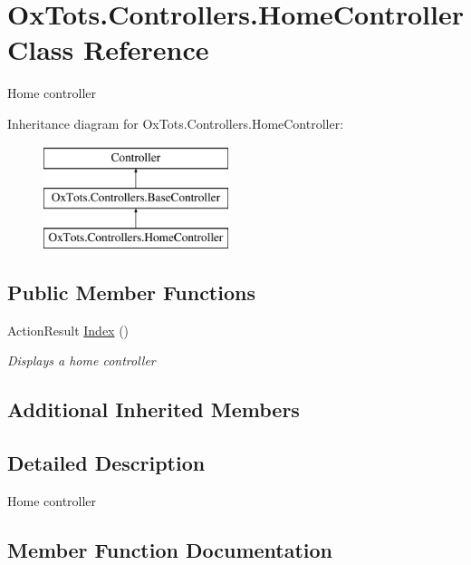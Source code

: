 \hypertarget{class_ox_tots_1_1_controllers_1_1_home_controller}{}\section{Ox\+Tots.\+Controllers.\+Home\+Controller Class Reference}
\label{class_ox_tots_1_1_controllers_1_1_home_controller}


Home controller  


Inheritance diagram for Ox\+Tots.\+Controllers.\+Home\+Controller\+:\begin{figure}[H]
\begin{center}
\leavevmode
\includegraphics[height=3.000000cm]{class_ox_tots_1_1_controllers_1_1_home_controller}
\end{center}
\end{figure}
\subsection*{Public Member Functions}
\begin{DoxyCompactItemize}
\item 
Action\+Result \mbox{\hyperlink{class_ox_tots_1_1_controllers_1_1_home_controller_a81810e31f8c1cfde9a0b55cd6916e93b}{Index}} ()
\begin{DoxyCompactList}\small\item\em Displays a home controller \end{DoxyCompactList}\end{DoxyCompactItemize}
\subsection*{Additional Inherited Members}


\subsection{Detailed Description}
Home controller 



\subsection{Member Function Documentation}
\mbox{\label{class_ox_tots_1_1_controllers_1_1_home_controller_a81810e31f8c1cfde9a0b55cd6916e93b}} 
